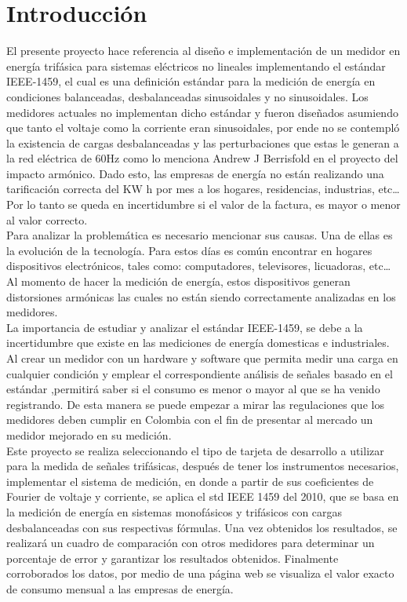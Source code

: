 

\newpage{\clearpage}
\chapter{ Introducción}

El presente proyecto hace referencia al diseño e implementación de un medidor en energía trifásica para sistemas eléctricos no lineales implementando el estándar IEEE-1459, el cual es una definición estándar para la medición de energía en condiciones balanceadas, desbalanceadas sinusoidales y no sinusoidales. Los medidores actuales no implementan dicho estándar y fueron diseñados asumiendo que tanto el voltaje como la corriente eran sinusoidales, por ende no se contempló la existencia de cargas desbalanceadas y las perturbaciones que estas le generan a la red eléctrica de 60Hz como lo menciona Andrew J Berrisfold en el proyecto del impacto armónico\cite{A43}. Dado esto, las empresas de energía no están realizando una tarificación correcta del KW h por mes a los hogares, residencias, industrias, etc… Por lo tanto se queda en incertidumbre si el valor de la factura, es mayor o menor al valor correcto.\\

Para analizar la problemática es necesario mencionar sus causas. Una de ellas es la evolución de la tecnología. Para estos días es común encontrar en hogares dispositivos electrónicos, tales como: computadores, televisores, licuadoras, etc… Al momento de hacer la medición de energía, estos dispositivos generan distorsiones armónicas las cuales no están siendo correctamente analizadas en los medidores.\\

La importancia de estudiar y analizar el estándar IEEE-1459, se debe a la incertidumbre que existe en las mediciones de energía domesticas e industriales. Al crear un medidor con un hardware y software que permita medir una carga en cualquier condición y emplear el correspondiente análisis de señales basado en el estándar ,permitirá saber si el consumo es menor o mayor al que se ha venido registrando. De esta manera se puede empezar a mirar las regulaciones que los medidores deben cumplir en Colombia con el fin de presentar al mercado un medidor mejorado en su medición.\\

Este proyecto se realiza seleccionando el tipo de tarjeta de desarrollo a utilizar para la medida de señales trifásicas, después de tener los instrumentos necesarios, implementar el sistema de medición, en donde a partir de sus coeficientes de Fourier de voltaje y corriente, se aplica el std IEEE 1459 del 2010, que se basa en la medición de energía en sistemas monofásicos y trifásicos con cargas desbalanceadas con sus respectivas fórmulas. Una vez obtenidos los resultados, se realizará un cuadro de comparación con otros medidores para determinar un porcentaje de error y garantizar los resultados obtenidos. Finalmente corroborados los datos, por medio de una página web se visualiza el valor exacto de consumo mensual a las empresas de energía. \\


